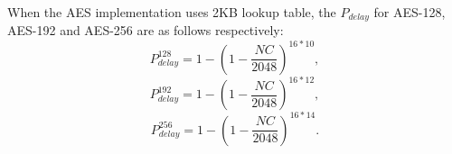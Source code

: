 
When the AES implementation uses 2KB lookup table, the $P_{delay}$ for AES-128, AES-192 and AES-256 are as follows respectively:
\begin{equation*}
    P_{delay}^{128} = 1- (1-\frac{NC}{2048})^{16*10},
\end{equation*}
\begin{equation*}
    P_{delay}^{192} = 1- (1-\frac{NC}{2048})^{16*12},
\end{equation*}
\begin{equation*}
    P_{delay}^{256} = 1- (1-\frac{NC}{2048})^{16*14}.
\end{equation*} 